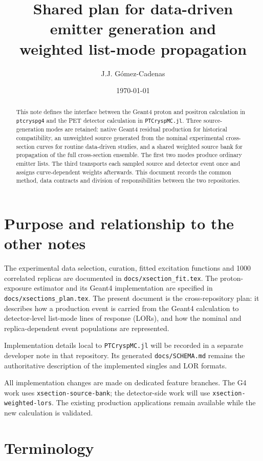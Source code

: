 \documentclass[11pt]{article}
\title{Shared plan for data-driven emitter generation and\\
weighted list-mode propagation}
\author{J.J. G\'omez-Cadenas}
\date{\today}
\newcommand{\file}[1]{\texttt{#1}}
\begin{document}
\maketitle

\begin{abstract}
This note defines the interface between the Geant4 proton and positron
calculation in \file{ptcryspg4} and the PET detector calculation in
\file{PTCryspMC.jl}.  Three source-generation modes are retained: native
Geant4 residual production for historical compatibility, an unweighted source
generated from the nominal experimental cross-section curves for routine
data-driven studies, and a shared weighted source bank for propagation of the
full cross-section ensemble.  The first two modes produce ordinary emitter
lists.  The third transports each sampled source and detector event once and
assigns curve-dependent weights afterwards.  This document records the common
method, data contracts and division of responsibilities between the two
repositories.
\end{abstract}

\section{Purpose and relationship to the other notes}

The experimental data selection, curation, fitted excitation functions and
1000 correlated replicas are documented in \file{docs/xsection\_fit.tex}.
The proton-exposure estimator and its Geant4 implementation are specified in
\file{docs/xsections\_plan.tex}.  The present document is the cross-repository
plan: it describes how a production event is carried from the Geant4
calculation to detector-level list-mode lines of response (LORs), and how the
nominal and replica-dependent event populations are represented.

Implementation details local to \file{PTCryspMC.jl} will be recorded in a
separate developer note in that repository.  Its generated
\file{docs/SCHEMA.md} remains the authoritative description of the implemented
singles and LOR formats.

All implementation changes are made on dedicated feature branches.  The G4
work uses \file{xsection-source-bank}; the detector-side work will use
\file{xsection-weighted-lors}.  The existing production applications remain
available while the new calculation is validated.

\section{Terminology}
\end{document}
